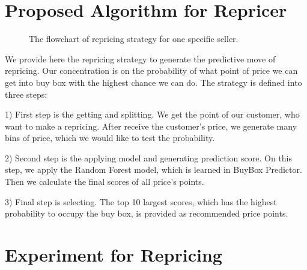 \section{Proposed Algorithm for Repricer}

\label{sec:repricermodel}


\begin{figure}[!h]
	\begin{center}
	\end{center}
	\caption{\label{fig:repricerflow}The flowchart of repricing strategy for one specific seller.
	}
\end{figure}

We provide here the repricing strategy to generate the predictive move of repricing. Our concentration is on the probability of what point of price we can get into buy box with the highest chance we can do. The strategy is defined into three steps:

1) First step is the getting and splitting. We get the point of our customer, who want to make a repricing.
After receive the customer's price, we generate many bins of price, which we would like to test the probability. 

2) Second step is the applying model and generating prediction score. On this step, we apply the Random Forest model, which is learned in BuyBox Predictor. Then we calculate the final scores of all price's points.

3) Final step is selecting. The top 10 largest scores, which has the highest probability to occupy the buy box, is provided as recommended price points. 


\section{Experiment for Repricing}
\label{sec:exprepricer}



